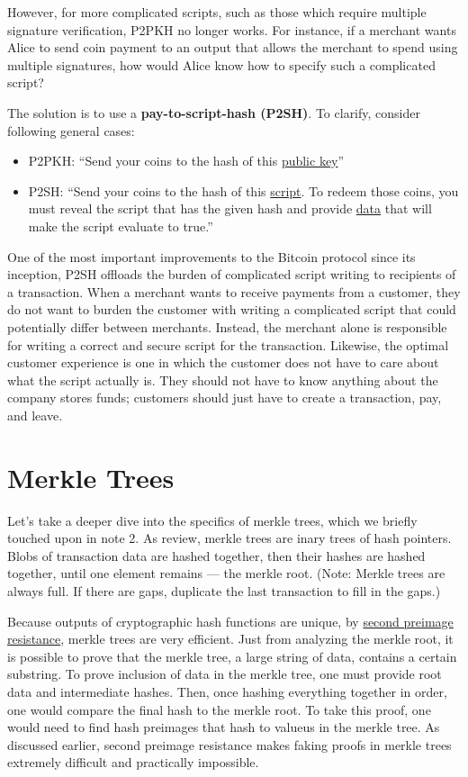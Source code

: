 \documentclass[11pt]{article}
\begin{document}
 However, for more complicated scripts, such as those which require multiple signature verification, P2PKH no longer works. For instance, if a merchant wants Alice to send coin payment to an output that allows the merchant to spend using multiple signatures, how would Alice know how to specify such a complicated script?
 
 The solution is to use a \textbf{pay-to-script-hash (P2SH)}. To clarify, consider following general cases:
 
 \begin{itemize}
     \item P2PKH: ``Send your coins to the hash of this \underline{public key}''
     \item P2SH: ``Send your coins to the hash of this \underline{script}. To redeem those coins, you must reveal the script that has the given hash and provide \underline{data} that will make the script evaluate to true.''
 \end{itemize}
 
 One of the most important improvements to the Bitcoin protocol since its inception, P2SH offloads the burden of complicated script writing to recipients of a transaction. When a merchant wants to receive payments from a customer, they do not want to burden the customer with writing a complicated script that could potentially differ between merchants. Instead, the merchant alone is responsible for writing a correct and secure script for the transaction. Likewise, the optimal customer experience is one in which the customer does not have to care about what the script actually is. They should not have to know anything about the company stores funds; customers should just have to create a transaction, pay, and leave.
 
 \section*{Merkle Trees}
 
 Let's take a deeper dive into the specifics of merkle trees, which we briefly touched upon in note 2. As review, merkle trees are inary trees of hash pointers. Blobs of transaction data are hashed together, then their hashes are hashed together, until one element remains --- the merkle root. (Note: Merkle trees are always full. If there are gaps, duplicate the last transaction to fill in the gaps.)
 
 Because outputs of cryptographic hash functions are unique, by \underline{second preimage resistance}, merkle trees are very efficient. Just from analyzing the merkle root, it is possible to prove that the merkle tree, a large string of data, contains a certain substring. To prove inclusion of data in the merkle tree, one must provide root data and intermediate hashes. Then, once hashing everything together in order, one would compare the final hash to the merkle root. To take this proof, one would need to find hash preimages that hash to valueus in the merkle tree. As discussed earlier, second preimage resistance makes faking proofs in merkle trees extremely difficult and practically impossible.
\end{document}
